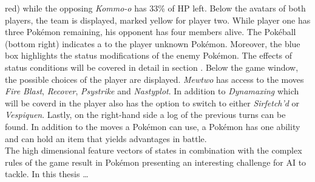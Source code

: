 red) while the opposing \textit{Kommo-o} has 33\% of \ac{HP} left. Below the avatars of both players,
the team is displayed, marked yellow for player two. While player one has three Pokémon remaining,
his opponent has four members alive. The Pokéball (bottom right) indicates a to the player unknown Pokémon.
Moreover, the blue box highlights the status modifications of the enemy Pokémon. The effects of status conditions
will be covered in detail in section . Below the game window, the possible choices of the
player are displayed. \textit{Mewtwo} has access to the moves \textit{Fire Blast}, \textit{Recover}, \textit{Psystrike}
and \textit{Nastyplot}. In addition to \textit{Dynamaxing} which will be coverd in  the player
also has the option to switch to either \textit{Sirfetch'd} or \textit{Vespiquen}. Lastly,
on the right-hand side a log of the previous turns can be found. In addition to the moves a Pokémon can use,
a Pokémon has one ability and can hold an item that yields advantages in battle. \\
The high dimensional feature vectors of states in combination with the complex rules of the game result in Pokémon 
presenting an interesting challenge for AI to tackle. In this thesis \dots \\

